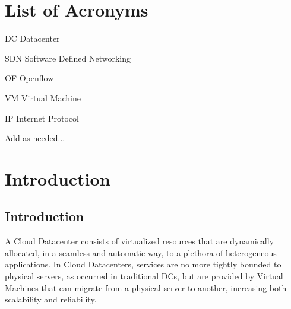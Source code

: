 \documentclass[12pt,english]{book}
\newenvironment{lyxlist}[1]
   {\begin{list}{}
     {\settowidth{\labelwidth}{#1}
      \setlength{\leftmargin}{\labelwidth}
      \addtolength{\leftmargin}{\labelsep}
      \renewcommand{\makelabel}[1]{##1\hfil}}}
   {\end{list}}
\begin{document}
\newpage

\cleardoublepage

\tableofcontents{}

\cleardoublepage

\chapter*{List of Acronyms}



\begin{lyxlist}{00.00.0000}
\begin{singlespace}
\item [DC]Datacenter
\item [SDN]Software Defined Networking
\item [OF]Openflow
\item [VM]Virtual Machine
\item [IP]Internet Protocol 
\item Add as needed...
\end{singlespace}
\end{lyxlist}

\cleardoublepage

\listoffigures

\cleardoublepage

\listoftables

\cleardoublepage

\setcounter{page}{0}



\chapter{Introduction\label{cha:introduction}}

\section{Introduction}

A Cloud Datacenter consists of virtualized resources that are dynamically allocated, in a seamless and automatic way, to a plethora of heterogeneous applications.
In Cloud Datacenters, services are no more tightly bounded to physical servers, as occurred in traditional DCs, but are provided by Virtual Machines that can migrate from a physical server to another, increasing both scalability and reliability.
\end{document}
